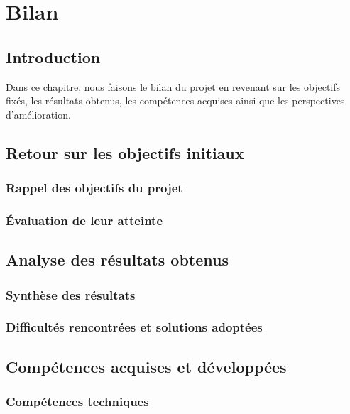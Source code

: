 \chapter{Bilan}
\clearpage

\section{Introduction}
Dans ce chapitre, nous faisons le bilan du projet en revenant sur les objectifs fixés, les résultats obtenus, les compétences acquises ainsi que les perspectives d'amélioration.

\section{Retour sur les objectifs initiaux}
\subsection{Rappel des objectifs du projet}

\subsection{Évaluation de leur atteinte}

\section{Analyse des résultats obtenus}

\subsection{Synthèse des résultats}

\subsection{Difficultés rencontrées et solutions adoptées}

\section{Compétences acquises et développées}
\subsection{Compétences techniques}


